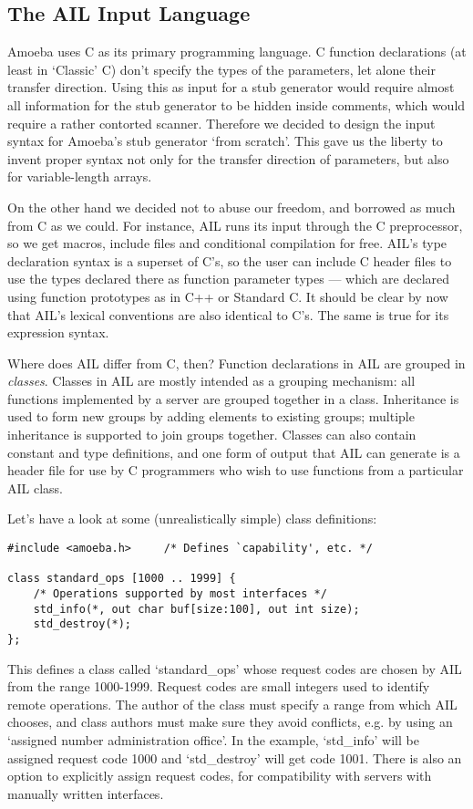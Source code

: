 \subsection{The AIL Input Language}

Amoeba uses C as its primary programming language.  C function
declarations (at least in `Classic' C) don't specify the types of
the parameters, let alone their transfer direction.  Using this as
input for a stub generator would require almost all information for
the stub generator to be hidden inside comments, which would require a
rather contorted scanner.  Therefore we decided to design the input
syntax for Amoeba's stub generator `from scratch'.  This gave us the
liberty to invent proper syntax not only for the transfer direction of
parameters, but also for variable-length arrays.

On the other hand we decided not to abuse our freedom, and borrowed as
much from C as we could.  For instance, AIL runs its input through the
C preprocessor, so we get macros, include files and conditional
compilation for free.  AIL's type declaration syntax is a superset of
C's, so the user can include C header files to use the types declared
there as function parameter types --- which are declared using
function prototypes as in C++ or Standard C\@.  It should be clear by
now that AIL's lexical conventions are also identical to C's.  The
same is true for its expression syntax.

Where does AIL differ from C, then?  Function declarations in AIL are
grouped in {\em classes}.  Classes in AIL are mostly intended as a
grouping mechanism: all functions implemented by a server are grouped
together in a class.  Inheritance is used to form new groups by adding
elements to existing groups; multiple inheritance is supported to join
groups together.  Classes can also contain constant and type
definitions, and one form of output that AIL can generate is a header
file for use by C programmers who wish to use functions from a
particular AIL class.

Let's have a look at some (unrealistically simple) class definitions:
\begin{verbatim}
#include <amoeba.h>     /* Defines `capability', etc. */

class standard_ops [1000 .. 1999] {
    /* Operations supported by most interfaces */
    std_info(*, out char buf[size:100], out int size);
    std_destroy(*);
};
\end{verbatim}
This defines a class called `standard\_ops' whose request codes are
chosen by AIL from the range 1000-1999.  Request codes are small
integers used to identify remote operations.  The author of the class
must specify a range from which AIL chooses, and class authors must
make sure they avoid conflicts, e.g. by using an `assigned number
administration office'.  In the example, `std\_info' will be assigned
request code 1000 and `std\_destroy' will get code 1001.  There is
also an option to explicitly assign request codes, for compatibility
with servers with manually written interfaces.

